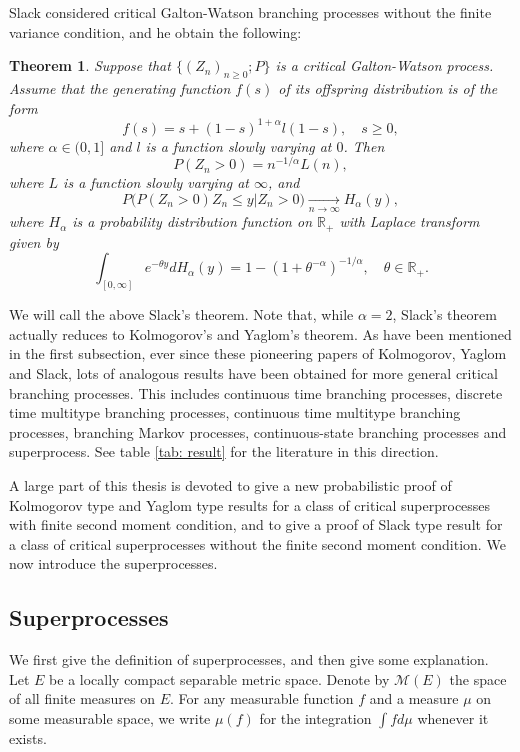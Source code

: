 \documentclass[UTF8]{pkuthss}
\theoremstyle{plain}
\newtheorem{thm}{Theorem}[section]
\theoremstyle{definition}
\numberwithin{equation}{section}
\begin{document}
	Slack \cite{Slack1968Branching} considered critical Galton-Watson branching processes without the finite variance condition, and he obtain the following:
\begin{thm}
\label{thm: Slack result}
	Suppose that $\{(Z_n)_{n\geq 0}; P\}$ is a critical Galton-Watson process. Assume that the generating function $f(s)$ of its offspring distribution is of the form
\[
	f(s) = s + (1-s)^{1+\alpha}l(1-s),\quad s\geq 0,
\]
	where $\alpha\in (0,1]$ and $l$ is a function slowly varying at $0$.
	Then 
\[
	P(Z_n > 0) = n^{-1/\alpha} L(n),
\]
	where $L$ is a function slowly varying at $\infty$, and
\[
	P\big( P(Z_n>0)Z_n \leq y |Z_n > 0\big)\xrightarrow[n\to\infty]{} H_\alpha(y),
\]
	where $H_\alpha$ is a probability distribution function on $\mathbb R_+$ with Laplace transform given by
\[
	\int_{[0,\infty]} e^{-\theta y} dH_\alpha(y) = 1-(1+\theta^{-\alpha})^{-1/\alpha},\quad \theta \in \mathbb R_+.
\]
\end{thm}
	We will call the above Slack's theorem.
	Note that, while $\alpha = 2$, Slack's theorem actually reduces to Kolmogorov's and Yaglom's theorem. 
	As have been mentioned in the first subsection, ever since these pioneering papers of Kolmogorov, Yaglom and Slack, lots of analogous results have been obtained for more general critical branching processes.
	This includes continuous time branching processes, discrete time multitype branching processes, continuous time multitype branching processes, branching Markov processes, continuous-state branching processes and superprocess.
	See table \ref{tab: result} for the literature in this direction. 

	A large part of this thesis is devoted to give a new probabilistic proof of Kolmogorov type and Yaglom type results for a class of critical superprocesses with finite second moment condition, and to give a proof of Slack type result for a class of critical superprocesses without the finite second moment condition. 
	We now introduce the superprocesses.
\subsection{Superprocesses}
	We first give the definition of superprocesses, and then give some explanation.
	Let $E$ be a locally compact separable metric space. 
	Denote by $\mathcal M(E)$ the space of all finite measures on $E$. 
	For any measurable function $f$ and a measure $\mu$ on some measurable space, we write $\mu(f)$ for the integration $\int f d\mu$ whenever it exists. 
	
\end{document}
